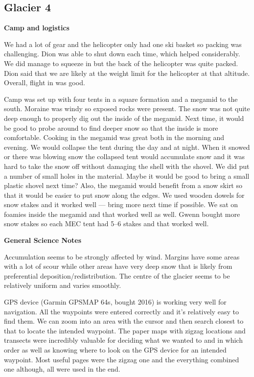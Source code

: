 \documentclass[12pt]{article}
\begin{document}
\subsection{Glacier 4}

\textbf{Camp and logistics}

We had a lot of gear and the helicopter only had one ski basket so packing was challenging. Dion was able to shut down each time, which helped considerably. We did manage to squeeze in but the back of the helicopter was quite packed. Dion said that we are likely at the weight limit for the helicopter at that altitude. Overall, flight in was good.

Camp was set up with four tents in a square formation and a megamid to the south. Moraine was windy so exposed rocks were present. The snow was not quite deep enough to properly dig out the inside of the megamid. Next time, it would be good to probe around to find deeper snow so that the inside is more comfortable. Cooking in the megamid was great both in the morning and evening. We would collapse the tent during the day and at night. When it snowed or there was blowing snow the collapsed tent would accumulate snow and it was hard to take the snow off without damaging the shell with the shovel. We did put a number of small holes in the material. Maybe it would be good to bring a small plastic shovel next time? Also, the megamid would benefit from a snow skirt so that it would be easier to put snow along the edges. We used wooden dowels for snow stakes and it worked well --- bring more next time if possible. We sat on foamies inside the megamid and that worked well as well. Gwenn bought more snow stakes so each MEC tent had 5--6 stakes and that worked well.

\vspace{4mm}
\noindent \textbf{General Science Notes}

Accumulation seems to be strongly affected by wind. Margins have some areas with a lot of scour while other areas have very deep snow that is likely from preferential deposition/redistribution. The centre of the glacier seems to be relatively uniform and varies smoothly. 

GPS device (Garmin GPSMAP 64s, bought 2016) is working very well for navigation. All the waypoints were entered correctly and it's relatively easy to find them. We can zoom into an area with the cursor and then search closest to that to locate the intended waypoint. The paper maps with zigzag locations and transects were incredibly valuable for deciding what we wanted to and in which order as well as knowing where to look on the GPS device for an intended waypoint. Most useful pages were the zigzag one and the everything combined one although, all were used in the end. 
\end{document}
